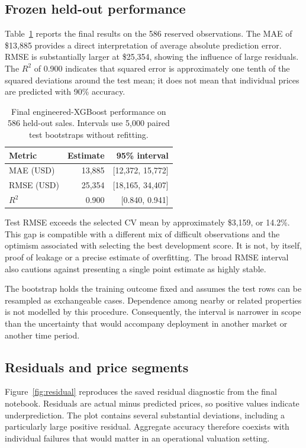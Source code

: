 \documentclass{sigkddExp}
\begin{document}
\subsection{Frozen held-out performance}
Table~\ref{tab:test} reports the final results on the 586 reserved observations. The MAE of \$13,885 provides a direct interpretation of average absolute prediction error. RMSE is substantially larger at \$25,354, showing the influence of large residuals. The $R^2$ of 0.900 indicates that squared error is approximately one tenth of the squared deviations around the test mean; it does not mean that individual prices are predicted with 90\% accuracy.

\begin{table}[t]
\caption{Final engineered-XGBoost performance on 586 held-out sales. Intervals use 5,000 paired test bootstraps without refitting.}
\label{tab:test}
\centering
\begin{tabular}{lrr}
\toprule
Metric & Estimate & 95\% interval\\
\midrule
MAE (USD) & 13,885 & [12,372, 15,772]\\
RMSE (USD) & 25,354 & [18,165, 34,407]\\
$R^2$ & 0.900 & [0.840, 0.941]\\
\bottomrule
\end{tabular}
\end{table}

Test RMSE exceeds the selected CV mean by approximately \$3,159, or 14.2\%. This gap is compatible with a different mix of difficult observations and the optimism associated with selecting the best development score. It is not, by itself, proof of leakage or a precise estimate of overfitting. The broad RMSE interval also cautions against presenting a single point estimate as highly stable.

The bootstrap holds the training outcome fixed and assumes the test rows can be resampled as exchangeable cases. Dependence among nearby or related properties is not modelled by this procedure. Consequently, the interval is narrower in scope than the uncertainty that would accompany deployment in another market or another time period.

\subsection{Residuals and price segments}
Figure~\ref{fig:residual} reproduces the saved residual diagnostic from the final notebook. Residuals are actual minus predicted prices, so positive values indicate underprediction. The plot contains several substantial deviations, including a particularly large positive residual. Aggregate accuracy therefore coexists with individual failures that would matter in an operational valuation setting.
\end{document}
